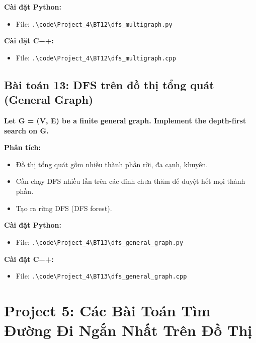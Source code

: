 \documentclass[12pt,a4paper]{article}
\begin{document}
\textbf{Cài đặt Python:}
\begin{itemize}[label=\textbullet]
   \item File: \texttt{.\textbackslash code\textbackslash Project\_4\textbackslash BT12\textbackslash dfs\_multigraph.py}
\end{itemize}

\textbf{Cài đặt C++:}
\begin{itemize}[label=\textbullet]
   \item File: \texttt{.\textbackslash code\textbackslash Project\_4\textbackslash BT12\textbackslash dfs\_multigraph.cpp}
\end{itemize}


\subsection{Bài toán 13: DFS trên đồ thị tổng quát (General Graph)}

\begin{problembox}
    \textbf{Let G = (V, E) be a finite general graph. Implement the depth-first search on G.} 
\end{problembox}

\textbf{Phân tích:}
\begin{itemize}[label=\textbullet]
    \item Đồ thị tổng quát gồm nhiều thành phần rời, đa cạnh, khuyên.
    \item Cần chạy DFS nhiều lần trên các đỉnh chưa thăm để duyệt hết mọi thành phần.
    \item Tạo ra rừng DFS (DFS forest).
\end{itemize}

\textbf{Cài đặt Python:}
\begin{itemize}[label=\textbullet]
   \item File: \texttt{.\textbackslash code\textbackslash Project\_4\textbackslash BT13\textbackslash dfs\_general\_graph.py}
\end{itemize}

\textbf{Cài đặt C++:}
\begin{itemize}[label=\textbullet]
   \item File: \texttt{.\textbackslash code\textbackslash Project\_4\textbackslash BT13\textbackslash dfs\_general\_graph.cpp}
\end{itemize}



\newpage


\section{Project 5: Các Bài Toán Tìm Đường Đi Ngắn Nhất Trên Đồ Thị}
\end{document}
